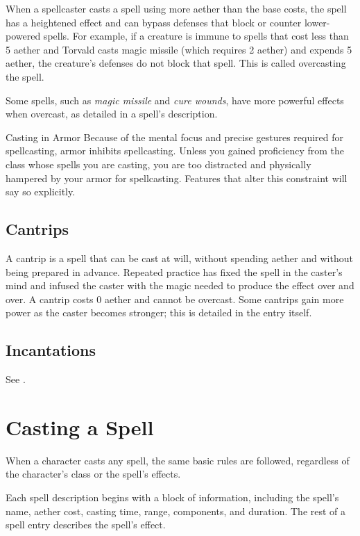 When a spellcaster casts a spell using more aether than the base costs, the spell has a heightened effect and can bypass defenses that block or counter lower-powered spells. For example, if a creature is immune to spells that cost less than 5 aether and Torvald casts magic missile (which requires 2 aether) and expends 5 aether, the creature's defenses do not block that spell. This is called overcasting the spell.

Some spells, such as \textit{magic missile} and \textit{cure wounds}, have more powerful effects when overcast, as detailed in a spell's description.

\begin{DndSidebar}{Casting in Armor}
    Because of the mental focus and precise gestures required for spellcasting, armor inhibits spellcasting. Unless you gained proficiency from the class whose spells you are casting, you are too distracted and physically hampered by your armor for spellcasting. Features that alter this constraint will say so explicitly.
\end{DndSidebar}

\subsection{Cantrips}

A cantrip is a spell that can be cast at will, without spending aether and without being prepared in advance. Repeated practice has fixed the spell in the caster's mind and infused the caster with the magic needed to produce the effect over and over. A cantrip costs 0 aether and cannot be overcast. Some cantrips gain more power as the caster becomes stronger; this is detailed in the entry itself.

\subsection{Incantations}
See .

\section{Casting a Spell}

When a character casts any spell, the same basic rules are followed, regardless of the character's class or the spell's effects.

Each spell description begins with a block of information, including the spell's name, aether cost, casting time, range, components, and duration. The rest of a spell entry describes the spell's effect.

